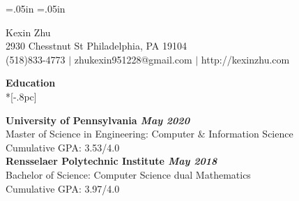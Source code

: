 \oddsidemargin=.05in
\evensidemargin=.05in
\textwidth=6.3in
\topmargin=-1.0in
\textheight=9in
\parindent=0in
\pagestyle{empty}

\newenvironment{list1}{
  \begin{list}{\ding{113}}{%
      \setlength{\itemsep}{0in}
      \setlength{\parsep}{0in} \setlength{\parskip}{0in}
      \setlength{\topsep}{0in} \setlength{\partopsep}{0in}
      \setlength{\leftmargin}{0.17in}}}{\end{list}}
\newenvironment{list2}{
  \begin{list}{$\bullet$}{%
      \setlength{\itemsep}{0in}
      \setlength{\parsep}{0in} \setlength{\parskip}{0in}
      \setlength{\topsep}{0in} \setlength{\partopsep}{0in}
      \setlength{\leftmargin}{0.2in}}}{\end{list}}

\vspace*{-.05in}


\begin{center}
{\Large Kexin Zhu} \\[.5pc]

2930 Chesstnut St Philadelphia, PA 19104\\
(518)833-4773 $|$ zhukexin951228@gmail.com $|$ http://kexinzhu.com  \\
\end{center}



{\large \bf Education} \\*[-.8pc]
\underline{\hspace{6.3in}} 

{\bf University of Pennsylvania \hfill \it May 2020 }\\
\rm Master of Science in Engineering:  Computer $\&$ Information Science \rm \\
Cumulative GPA: 3.53/4.0\rm\\
{\bf Rensselaer Polytechnic Institute \hfill \it May 2018 }\\
Bachelor of Science:  Computer Science  dual  Mathematics \rm \\
\rm Cumulative GPA: 3.97/4.0   \\
%




